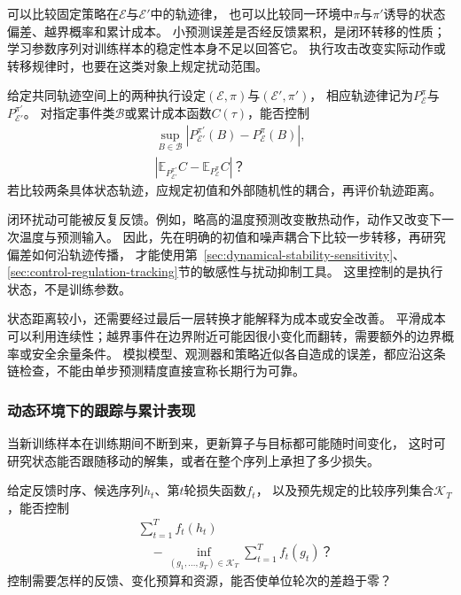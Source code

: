 可以比较固定策略在$\mathcal E$与$\mathcal E'$中的轨迹律，
也可以比较同一环境中$\pi$与$\pi'$诱导的状态偏差、越界概率和累计成本。
小预测误差是否经反馈累积，是闭环转移的性质；
学习参数序列对训练样本的稳定性本身不足以回答它。
执行攻击改变实际动作或转移规律时，也要在这类对象上规定扰动范围。

\begin{mathproblem}[闭环过程对环境与策略变化的响应]
  \label{question:future-trajectory-perturbation}
  给定共同轨迹空间上的两种执行设定$(\mathcal E,\pi)$与$(\mathcal E',\pi')$，
  相应轨迹律记为$P_{\mathcal E}^{\pi}$与$P_{\mathcal E'}^{\pi'}$。
  对指定事件类$\mathcal B$或累计成本函数$C(\tau)$，能否控制
  \[
    \begin{gathered}
      \sup_{B\in\mathcal B}
        |P_{\mathcal E'}^{\pi'}(B)-P_{\mathcal E}^{\pi}(B)|,\\
      |\mathbb E_{P_{\mathcal E'}^{\pi'}}C
       -\mathbb E_{P_{\mathcal E}^{\pi}}C|\text{？}
    \end{gathered}
  \]
  若比较两条具体状态轨迹，应规定初值和外部随机性的耦合，再评价轨迹距离。
\end{mathproblem}

闭环扰动可能被反复反馈。例如，略高的温度预测改变散热动作，动作又改变下一次温度与预测输入。
因此，先在明确的初值和噪声耦合下比较一步转移，再研究偏差如何沿轨迹传播，
才能使用第~\ref{sec:dynamical-stability-sensitivity}、\ref{sec:control-regulation-tracking}节的敏感性与扰动抑制工具。
这里控制的是执行状态，不是训练参数。

状态距离较小，还需要经过最后一层转换才能解释为成本或安全改善。
平滑成本可以利用连续性；越界事件在边界附近可能因很小变化而翻转，需要额外的边界概率或安全余量条件。
模拟模型、观测器和策略近似各自造成的误差，都应沿这条链检查，不能由单步预测精度直接宣称长期行为可靠。

\subsubsection{动态环境下的跟踪与累计表现}
\label{sec:future-analysis-cumulative-comparison}

当新训练样本在训练期间不断到来，更新算子与目标都可能随时间变化，
这时可研究状态能否跟随移动的解集，或者在整个序列上承担了多少损失。

\begin{mathproblem}[序列相对于比较者的累计表现]
  \label{question:future-cumulative-comparison}
  给定反馈时序、候选序列$h_t$、第$t$轮损失函数$f_t$，
  以及预先规定的比较序列集合$\mathcal K_T$，能否控制
  \[
    \begin{aligned}
      &\sum_{t=1}^Tf_t(h_t)\\
      &\quad-\inf_{(g_1,\ldots,g_T)\in\mathcal K_T}
         \sum_{t=1}^Tf_t(g_t)\text{？}
    \end{aligned}
  \]
  控制需要怎样的反馈、变化预算和资源，能否使单位轮次的差趋于零？
\end{mathproblem}

